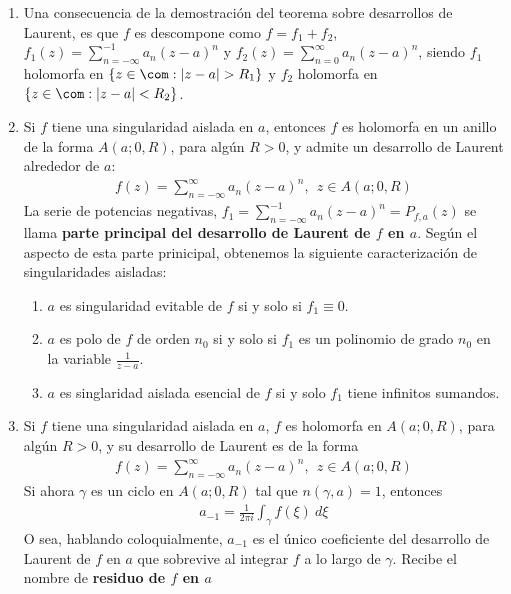 \begin{obs}
\begin{enumerate}
    \item Una consecuencia de la demostración del teorema sobre desarrollos de Laurent, es que $f$ es descompone como $f = f_1 + f_2$, $f_1(z) = \sum_{n=-\infty}^{-1}a_n(z-a)^n$ y $f_2(z) = \sum_{n=0}^{\infty} a_n (z-a)^n$, siendo $f_1$ holomorfa en $\{ z \in \com : |z-a| > R_1 \}$ y $f_2$ holomorfa en $\{ z \in \com : |z-a| < R_2 \}$.
    \item Si $f$ tiene una singularidad aislada en $a$, entonces $f$ es holomorfa en un anillo de la forma $A(a;0,R)$, para algún $R > 0$, y admite un desarrollo de Laurent alrededor de $a$:
    \begin{align*}
        f(z) = \sum_{n=-\infty}^{\infty}{a_n(z-a)^n}, \ \ z \in A(a;0,R)
    \end{align*}
    La serie de potencias negativas, $f_1 = \sum_{n=-\infty}^{-1}a_n(z-a)^n = P_{f,a}(z)$ se llama \textbf{parte principal del desarrollo de Laurent de $f$ en $a$}. Según el aspecto de esta parte prinicipal, obtenemos la siguiente caracterización de singularidades aisladas:
    \begin{enumerate}
        \item $a$ es singularidad evitable de $f$ si y solo si $f_1 \equiv 0$.
        \item $a$ es polo de $f$ de orden $n_0$ si y solo si $f_1$ es un polinomio de grado $n_0$ en la variable $\frac{1}{z-a}$.
        \item $a$ es singlaridad aislada esencial de $f$ si y solo $f_1$ tiene infinitos sumandos.
    \end{enumerate}
    \item Si $f$ tiene una singularidad aislada en $a$, $f$ es holomorfa en $A(a;0,R)$, para algún $R > 0$, y su desarrollo de Laurent es de la forma
        \begin{align*}
        f(z) = \sum_{n=-\infty}^{\infty}{a_n(z-a)^n}, \ \ z \in A(a;0,R)
    \end{align*}
    Si ahora $\gamma$ es un ciclo en $A(a;0,R)$ tal que $n(\gamma,a) = 1$, entonces
    \begin{align*}
        a_{-1} = \frac{1}{2\pi i} \int_{\gamma} f(\xi) \ d \xi
    \end{align*}
    O sea, hablando coloquialmente, $a_{-1}$ es el único coeficiente del desarrollo de Laurent de $f$ en $a$ que sobrevive al integrar $f$ a lo largo de $\gamma$. Recibe el nombre de \textbf{residuo de $f$ en $a$} 
    \begin{align*}

\end{align*}
\end{enumerate}
\end{obs}
